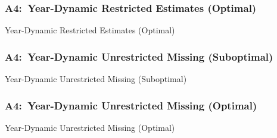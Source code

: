 \documentclass[12pt, aspectratio=169]{beamer}
\begin{document}
\begin{frame}[label=ydreo]
\frametitle{A4:\ Year-Dynamic Restricted Estimates (Optimal)}
\addtocounter{framenumber}{-1}
\begin{table}[htbp]
  \centering
  \vspace{-5pt}
  \addtocounter{table}{-1}
  \renewcommand{\thetable}{\arabic{table}b}
  \caption{Year-Dynamic Restricted Estimates (Optimal)}
  \vspace{5pt}
  \begin{adjustbox}{totalheight=.7\textheight}

  \end{adjustbox}
\end{table}%
\hyperlink{ysreo}{}
\end{frame}

\begin{frame}[label=ydums]
\frametitle{A4:\ Year-Dynamic Unrestricted Missing (Suboptimal)}
\begin{table}[htbp]
  \centering
  \renewcommand{\thetable}{\arabic{table}a}
  \caption{Year-Dynamic Unrestricted Missing (Suboptimal)}
  \vspace{5pt}
  \begin{adjustbox}{totalheight=.7\textheight}

  \end{adjustbox}
\end{table}%
\hyperlink{ydues}{}
\end{frame}

\begin{frame}[label=ydumo]
\frametitle{A4:\ Year-Dynamic Unrestricted Missing (Optimal)}
\addtocounter{framenumber}{-1}
\begin{table}[htbp]
  \centering
  \addtocounter{table}{-1}
  \renewcommand{\thetable}{\arabic{table}b}
  \caption{Year-Dynamic Unrestricted Missing (Optimal)}
  \vspace{5pt}
  \begin{adjustbox}{totalheight=.7\textheight}

  \end{adjustbox}
\end{table}%
\hyperlink{ydueo}{}
\end{frame}
\end{document}
